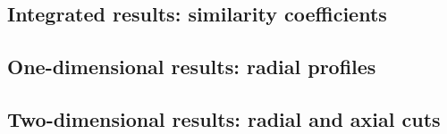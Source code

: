 
\subsection{Integrated results: similarity coefficients}
\label{sub:dream_ls_hb_sim_coeff}



\subsection{One-dimensional results: radial profiles}
\label{sub:dream_ls_hb_radial_profiles}

\subsection{Two-dimensional results: radial and axial cuts}
\label{sub:dream_ls_hb_axial_radial_cuts}
